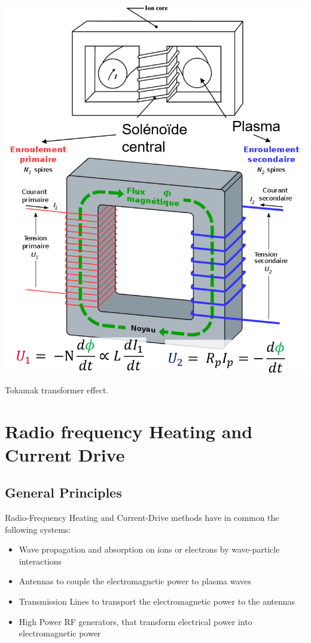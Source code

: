 \begin{marginfigure}[-3cm]
	\includegraphics[width=1\linewidth]{figures/chap1/tokamak_transformer_effect}
	\caption{Tokamak transformer effect.}
	\label{fig:tokamak_transformer_effect}
\end{marginfigure}



\section{Radio frequency Heating and Current Drive}
\subsection{General Principles}
Radio-Frequency Heating and Current-Drive methods have in common the following systems:
\begin{itemize}
	\item Wave propagation and absorption on ions or electrons by wave-particle interactions
	\item Antennas to couple the electromagnetic power to plasma waves
	\item Transmission Lines to transport the electromagnetic power to the antennas
	\item High Power RF generators, that transform electrical power into electromagnetic power
\end{itemize}


